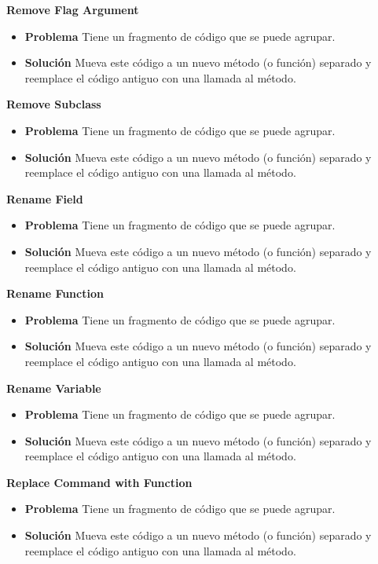 \documentclass[11pt,a4paper,oneside]{book}
\begin{document}
\textbf{Remove Flag Argument}
\label{RemoveFlagArgument}
\begin{itemize}
    \item \textbf{Problema} Tiene un fragmento de código que se puede agrupar.
    \item \textbf{Solución} Mueva este código a un nuevo método (o función) separado y reemplace el código antiguo con una llamada al método.
\end{itemize}


\textbf{Remove Subclass}
\label{RemobeSubclass}
\begin{itemize}
    \item \textbf{Problema} Tiene un fragmento de código que se puede agrupar.
    \item \textbf{Solución} Mueva este código a un nuevo método (o función) separado y reemplace el código antiguo con una llamada al método.
\end{itemize}

\textbf{Rename Field}
\label{RenameField}
\begin{itemize}
    \item \textbf{Problema} Tiene un fragmento de código que se puede agrupar.
    \item \textbf{Solución} Mueva este código a un nuevo método (o función) separado y reemplace el código antiguo con una llamada al método.
\end{itemize}

\textbf{Rename Function}
\label{RenameFunction}
\begin{itemize}
    \item \textbf{Problema} Tiene un fragmento de código que se puede agrupar.
    \item \textbf{Solución} Mueva este código a un nuevo método (o función) separado y reemplace el código antiguo con una llamada al método.
\end{itemize}

\textbf{Rename Variable}
\label{RenameVariable}
\begin{itemize}
    \item \textbf{Problema} Tiene un fragmento de código que se puede agrupar.
    \item \textbf{Solución} Mueva este código a un nuevo método (o función) separado y reemplace el código antiguo con una llamada al método.
\end{itemize}

\textbf{Replace Command with Function}
\label{ReplaceCommandWithFunction}
\begin{itemize}
    \item \textbf{Problema} Tiene un fragmento de código que se puede agrupar.
    \item \textbf{Solución} Mueva este código a un nuevo método (o función) separado y reemplace el código antiguo con una llamada al método.
\end{itemize}
\end{document}
